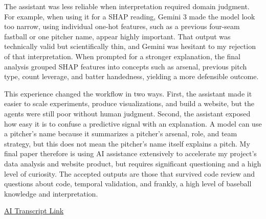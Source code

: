 \documentclass[9pt,twoside]{pnas-new}
\begin{document}
The assistant was less reliable when interpretation required domain judgment. For example, when using it for a SHAP reading, Gemini 3 made the model look too narrow, using individual one-hot features, such as a previous four-seam fastball or one pitcher name, appear highly important. That output was technically valid but scientifically thin, and Gemini was hesitant to my rejection of that interpretation. When prompted for a stronger explanation, the final analysis grouped SHAP features into concepts such as arsenal, previous pitch type, count leverage, and batter handedness, yielding a more defensible outcome. 

This experience changed the workflow in two ways. First, the assistant made it easier to scale experiments, produce visualizations, and build a website, but the agents were still poor without human judgment. Second, the assistant exposed how easy it is to confuse a predictive signal with an explanation. A model can use a pitcher's name because it summarizes a pitcher's arsenal, role, and team strategy, but this does not mean the pitcher's name itself explains a pitch. My final paper therefore is using AI assistance extensively to accelerate my project's data analysis and website product, but requires significant questioning and a high level of curiosity. The accepted outputs are those that survived code review and questions about code, temporal validation, and frankly, a high level of baseball knowledge and interpretation.

\href{https://docs.google.com/document/d/1mokZbiQgp-POLGlgpM5lacJ6LA4XFGBKIqMvBdzO-j0/edit?usp=sharing}{AI Transcript Link}


\end{document}
